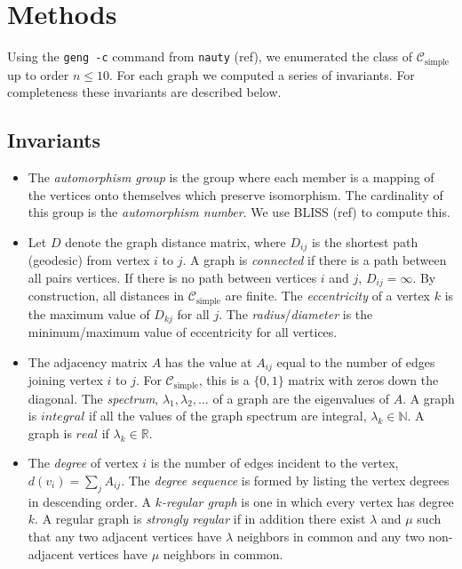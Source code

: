 \documentclass[12pt]{article}
\newcommand{\SIMPLECLASS}{\mathcal{C}_\text{simple}}
\begin{document}
\section{Methods}
Using the \texttt{geng -c} command from \texttt{nauty} (ref), we enumerated the class of $\SIMPLECLASS$ up to order $n \le 10$.
For each graph we computed a series of invariants.
For completeness these invariants are described below.

\subsection{Invariants}

\begin{itemize}

\item The \textit{automorphism group} is the group where each member is a mapping of the vertices onto themselves which preserve isomorphism. 
The cardinality of this group is the \textit{automorphism number}.
We use BLISS (ref) to compute this.

\item Let $D$ denote the graph distance matrix, where $D_{ij}$ is the shortest path (geodesic) from vertex $i$ to $j$.
A graph is \textit{connected} if there is a path between all pairs vertices.
If there is no path between vertices $i$ and $j$, $D_{ij}=\infty$.
By construction, all distances in $\SIMPLECLASS$ are finite.
The \textit{eccentricity} of a vertex $k$ is the maximum value of $D_{k j}$ for all $j$.
The \textit{radius}/\textit{diameter} is the minimum/maximum value of eccentricity for all vertices.

\item The adjacency matrix $A$ has the value at $A_{ij}$ equal to the number of edges joining vertex $i$ to $j$. 
For $\SIMPLECLASS$, this is a $\{0,1\}$ matrix with zeros down the diagonal. 
The \textit{spectrum}, $\lambda_1, \lambda_2, \ldots$ of a graph are the eigenvalues of $A$. 
A graph is $integral$ if all the values of the graph spectrum are integral, $\lambda_k \in \mathbb{N}$. 
A graph is $real$ if $\lambda_k \in \mathbb{R}$.

\item The \textit{degree} of vertex $i$ is the number of edges incident to the vertex, $d(v_i) = \sum_j A_{ij}$. 
The \textit{degree sequence} is formed by listing the vertex degrees in descending order.  
A \textit{$k$-regular graph} is one in which every vertex has degree $k$. 
A regular graph is \textit{strongly regular} if in addition there exist $\lambda$ and $\mu$ such that any two adjacent vertices have $\lambda$ neighbors in common and any two non-adjacent vertices have $\mu$ neighbors in common. 


\end{itemize}
\end{document}
